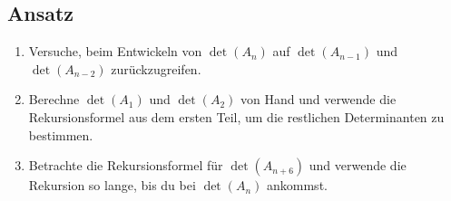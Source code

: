 \subsection{Ansatz}
\begin{enumerate}
	\item Versuche, beim Entwickeln von \( \det(A_n) \) auf \( \det(A_{n-1}) \) und \( \det(A_{n-2}) \) zurückzugreifen.
	\item Berechne \( \det(A_1) \) und \( \det(A_2) \) von Hand und verwende die Rekursionsformel aus dem ersten Teil, um die restlichen Determinanten zu bestimmen.
	\item Betrachte die Rekursionsformel für \( \det(A_{n+6}) \) und verwende die Rekursion so lange, bis du bei \( \det(A_n) \) ankommst.
\end{enumerate}

